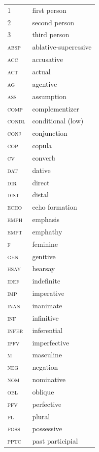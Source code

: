 \documentclass[output=paper]{langsci/langscibook}
\begin{document}
\begin{tabularx}{.45\textwidth}{lQ}
	1		&	first person	\\
	2		&	second person	\\
	3		&	third person	\\
\textsc{	absp	}	&	ablative-superessive	\\
\textsc{	acc	}	&	accusative	\\
\textsc{	act	}	&	actual	\\
\textsc{	ag	}	&	agentive	\\
\textsc{	ass	}	&	assumption	\\
\textsc{	comp	}	&	complementizer	\\
\textsc{	condl	}	&	conditional (low)	\\
\textsc{	conj	}	&	conjunction	\\
\textsc{	cop	}	&	copula	\\
\textsc{	cv	}	&	converb	\\
\textsc{	dat	}	&	dative	\\
\textsc{	dir	}	&	direct	\\
\textsc{	dist	}	&	distal	\\
\textsc{	echo	}	&	echo formation	\\
\textsc{	emph	}	&	emphasis	\\
\textsc{	empt	}	&	emphathy	\\
\textsc{	f	}	&	feminine	\\
\textsc{	gen	}	&	genitive	\\
\textsc{	hsay	}	&	hearsay	\\
\textsc{	idef	}	&	indefinite	\\
\textsc{	imp	}	&	imperative	\\
\textsc{	inan	}	&	inanimate	\\
\textsc{	inf	}	&	infinitive	\\
\textsc{	infer	}	&	inferential	\\
\textsc{	ipfv	}	&	imperfective	\\
\textsc{	m	}	&	masculine	\\
\textsc{	neg	}	&	negation	\\
\textsc{	nom	}	&	nominative	\\
\textsc{	obl	}	&	oblique	\\
\textsc{	pfv	}	&	perfective	\\
\textsc{	pl	}	&	plural	\\
\textsc{	poss	}	&	possessive	\\
\textsc{	pptc	}	&	past participial	\\

\end{tabularx}
\end{document}
